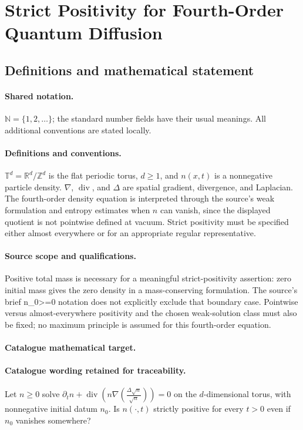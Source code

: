 \documentclass[11pt]{article}
\begin{document}
\section{Strict Positivity for Fourth-Order Quantum Diffusion}\label{statement}

\subsection{Definitions and mathematical statement}

\paragraph{Shared notation.}$\mathbb N=\{1,2,\ldots\}$; the standard number fields have their usual meanings. All additional conventions are stated locally.


\paragraph{Definitions and conventions.} $\mathbb T^d=\mathbb R^d/\mathbb Z^d$ is the flat periodic torus, $d\ge1$, and $n(x,t)$ is a nonnegative particle density. $\nabla$, $\operatorname{div}$, and $\Delta$ are spatial gradient, divergence, and Laplacian. The fourth-order density equation is interpreted through the source's weak formulation and entropy estimates when $n$ can vanish, since the displayed quotient is not pointwise defined at vacuum. Strict positivity must be specified either almost everywhere or for an appropriate regular representative.

\paragraph{Source scope and qualifications.} Positive total mass is necessary for a meaningful strict-positivity assertion: zero initial mass gives the zero density in a mass-conserving formulation. The source's brief n\_0>=0 notation does not explicitly exclude that boundary case. Pointwise versus almost-everywhere positivity and the chosen weak-solution class must also be fixed; no maximum principle is assumed for this fourth-order equation.

\paragraph{Catalogue mathematical target.}
\paragraph{Catalogue wording retained for traceability.}
Let $n\geq0$ solve $\partial_t n+\operatorname{div}\!\left(n\nabla\left(\frac{\Delta\sqrt n}{\sqrt n}\right)\right)=0$ on the $d$-dimensional torus, with nonnegative initial datum $n_0$. Is $n(\cdot,t)$ strictly positive for every $t>0$ even if $n_0$ vanishes somewhere?
\end{document}
